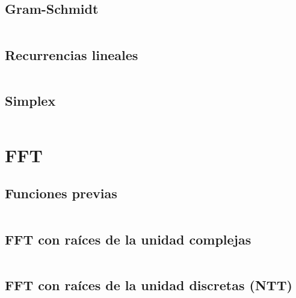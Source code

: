 \documentclass[11pt]{article}
\begin{document}
		\subsection{Gram-Schmidt}
		\inputminted[tabsize=2,breaklines,firstline=408,lastline=422,fontsize=\small]{c++}{matrix.cpp}
		
		\subsection{Recurrencias lineales}
		\inputminted[tabsize=2,breaklines,firstline=7,lastline=38,fontsize=\small]{c++}{recurrence.cpp}
		
		\subsection{Simplex}
		\inputminted[tabsize=2,breaklines,fontsize=\small]{c++}{simplex.cpp}
		
		
	\newpage
	\section{FFT}
		\subsection{Funciones previas}
		\inputminted[tabsize=2,breaklines,firstline=3,lastline=11,fontsize=\small]{c++}{fft.cpp}
		
		\subsection{FFT con raíces de la unidad complejas}
		\inputminted[tabsize=2,breaklines,firstline=13,lastline=44,fontsize=\small]{c++}{fft.cpp}
		
		\subsection{FFT con raíces de la unidad discretas (NTT)}
		\inputminted[tabsize=2,breaklines,firstline=46,lastline=90,fontsize=\small]{c++}{fft.cpp}
\end{document}
